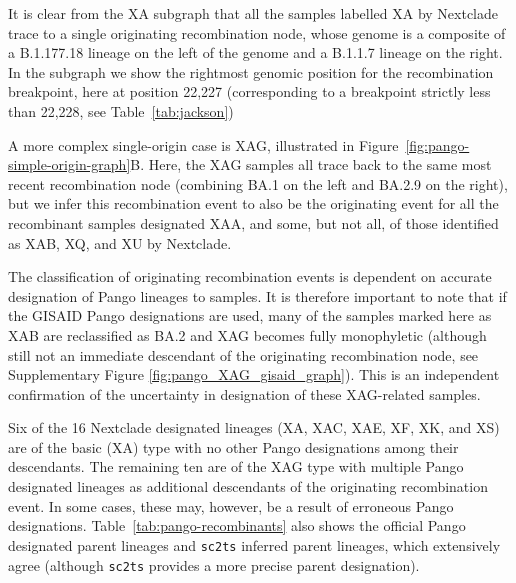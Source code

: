 \documentclass{article}
\begin{document}
It is clear from the XA subgraph that all the samples labelled XA by Nextclade trace to a
single originating recombination node, whose genome is a composite of a B.1.177.18 lineage
on the left of the genome and a B.1.1.7 lineage on the right. In the subgraph we show
the rightmost genomic position for the recombination breakpoint, here at position 22,227
(corresponding to a breakpoint strictly less than 22,228, see Table~\ref{tab:jackson})


A more complex single-origin case is XAG, illustrated in
Figure~\ref{fig:pango-simple-origin-graph}B. Here, the XAG samples
all trace back to the same most recent recombination node
(combining BA.1 on the left and BA.2.9 on the right), but
we infer this recombination event to also be the originating event for
all the recombinant samples designated XAA,
and some, but not all, of those identified as XAB, XQ, and XU by Nextclade.

The classification of originating recombination events is dependent on
accurate designation of Pango lineages to samples. It is therefore important
to note that if the GISAID Pango designations are used, many of the samples
marked here as XAB are reclassified as BA.2 and XAG becomes fully monophyletic
(although still not an immediate descendant of the originating recombination node,
see Supplementary Figure \ref{fig:pango_XAG_gisaid_graph}). This is an
independent confirmation of the uncertainty in designation of these XAG-related
samples.

Six of the 16 Nextclade designated lineages (XA, XAC, XAE, XF, XK, and XS) are of the
basic (XA) type with no other Pango designations among their descendants.
The remaining ten are of the XAG type with multiple Pango
designated lineages as additional descendants of the originating recombination event.
In some cases,
these may, however, be a result of erroneous Pango designations.
Table~\ref{tab:pango-recombinants} also shows the official
Pango designated parent lineages and \texttt{sc2ts} inferred parent lineages,
which extensively agree (although \texttt{sc2ts} provides a more precise
parent designation).
\end{document}
